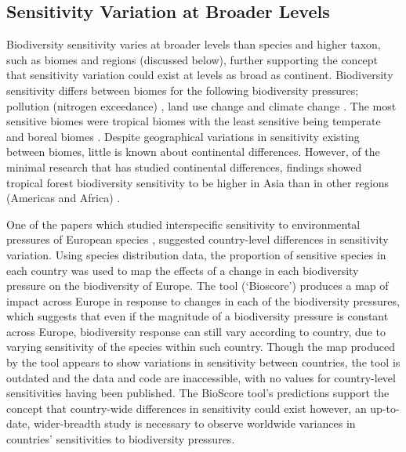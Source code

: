 \documentclass[11pt, a4paper, titlepage]{article}
\begin{document}
   	 \subsection*{Sensitivity Variation at Broader Levels}
   	 Biodiversity sensitivity varies at broader levels than species and higher taxon, such as biomes and regions (discussed below), further supporting the concept that sensitivity variation could exist at levels as broad as continent. Biodiversity sensitivity differs between biomes for the following biodiversity pressures; pollution (nitrogen exceedance) \citep{alkemade2009globio3}, land use change and climate change \citep{newbold2020tropical}. The most sensitive biomes were tropical biomes \citep{barlow2016anthropogenic} with the least sensitive being temperate and boreal biomes \citep{newbold2020tropical, cazalis2021mismatch, barlow2016anthropogenic}. Despite geographical variations in sensitivity existing between biomes, little is known about continental differences. However, of the minimal research that has studied continental differences, findings showed tropical forest biodiversity sensitivity to be higher in Asia than in other regions (Americas and Africa) \citep{gibson2011primary}.
   	 
   	 One of the papers which studied interspecific sensitivity to environmental pressures of European species \citep{louette2010bioscore}, suggested country-level differences in sensitivity variation. Using species distribution data, the proportion of sensitive species in each country was used to map the effects of a change in each biodiversity pressure on the biodiversity of Europe. The tool (`Bioscore') produces a map of impact across Europe in response to changes in each of the biodiversity pressures, which suggests that even if the magnitude of a biodiversity pressure is constant across Europe, biodiversity response can still vary according to country, due to varying sensitivity of the species within such country. Though the map produced by the tool appears to show variations in sensitivity between countries, the tool is outdated and the data and code are inaccessible, with no values for country-level sensitivities having been published. The BioScore tool's predictions support the concept that country-wide differences in sensitivity could exist however, an up-to-date, wider-breadth study is necessary to observe worldwide variances in countries' sensitivities to biodiversity pressures. 
   	 
\end{document}

